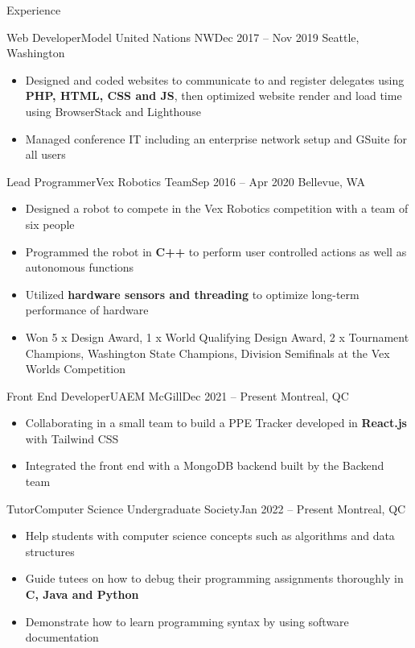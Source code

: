 \documentclass[]{mcdowellcv}
\begin{document}
\begin{cvsection}{Experience}
	\begin{cvsubsection}{Web Developer}{Model United Nations NW}{Dec 2017 -- Nov 2019}
	\vspace{-1.5mm}
		Seattle, Washington
		\begin{itemize}%
			\item Designed and coded websites to communicate to and register delegates using \textbf{PHP, HTML, CSS and JS}, then optimized website render and load time using BrowserStack and Lighthouse
			\item Managed conference IT including an enterprise network setup and GSuite for all users
		\end{itemize}
	\end{cvsubsection}
	\begin{cvsubsection}{Lead Programmer}{Vex Robotics Team}{Sep 2016 -- Apr 2020}
	\vspace{-1.5mm}
		Bellevue, WA
		\begin{itemize}%
			\item Designed a robot to compete in the Vex Robotics competition with a team of six people
			\item Programmed the robot in \textbf{C++} to perform user controlled actions as well as autonomous functions
			\item Utilized \textbf{hardware sensors and threading} to optimize long-term performance of hardware
			\item Won 5 x Design Award, 1 x World Qualifying Design Award, 2 x Tournament Champions, Washington State Champions, Division Semifinals at the Vex Worlds Competition
		\end{itemize}
	\end{cvsubsection}
	\begin{cvsubsection}{Front End Developer}{UAEM McGill}{Dec 2021 -- Present}
	\vspace{-1.5mm}
		Montreal, QC
		\begin{itemize}%
			\item Collaborating in a small team to build a PPE Tracker developed in \textbf{React.js} with Tailwind CSS
			\item Integrated the front end with a MongoDB backend built by the Backend team
		\end{itemize}
	\end{cvsubsection}
	\begin{cvsubsection}{Tutor}{Computer Science Undergraduate Society}{Jan 2022 -- Present}
	\vspace{-1.5mm}
		Montreal, QC
		\begin{itemize}%
			\item Help students with computer science concepts such as algorithms and data structures
			\item Guide tutees on how to debug their programming assignments thoroughly in \textbf{C, Java and Python}
			\item Demonstrate how to learn programming syntax by using software documentation
		\end{itemize}
	\end{cvsubsection}
\end{cvsection}
\end{document}
